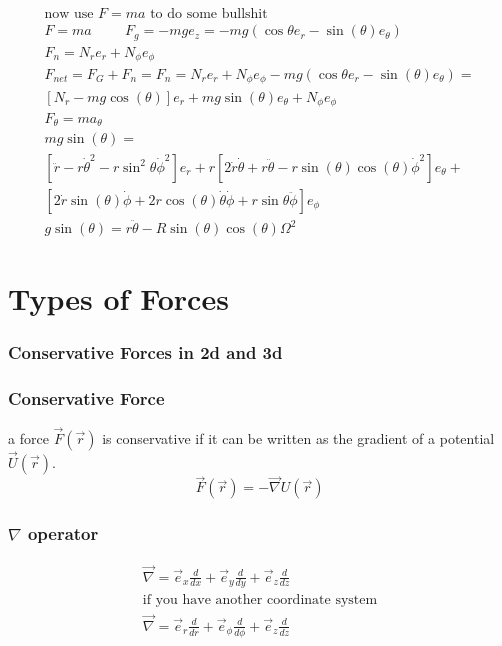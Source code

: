 \documentclass[fleqn]{report}
\newcommand{\hp}{\hspace{1cm}}
\newcommand{\equations} [1] {
\begin{gather*}
#1
\end{gather*}
}
\begin{document}
\equations{
    \textrm{now use $F = ma$ to do some bullshit}
    \\
    F = ma \hp F_g = -mg e_z = 
    -mg (\cos \theta e_r - \sin(\theta) e_\theta )
    \\
    F_n = N_r e_r + N_\phi e_\phi
    \\
    F_{net} = F_G + F_n = 
    F_n = N_r e_r + N_\phi e_\phi
    -mg (\cos \theta e_r - \sin(\theta) e_\theta )
    = \\
    [N_r - mg \cos(\theta)] e_r +
    mg \sin (\theta) e_\theta + 
    N_\phi e_\phi
    \\
    F_\theta = m a_\theta
    \\
    mg \sin(\theta) = \\
    [\ddot r - r \dot \theta^2 - 
    r \sin^2 \theta \dot \phi^2] e_r 
    +
    r[2 \dot r \dot \theta + r \ddot \theta  - 
    r \sin(\theta) \cos(\theta) \dot \phi^2] e_\theta 
    + \\
    [2\dot r \sin(\theta) \dot \phi + 
    2 r \cos(\theta) \dot \theta \dot \phi +
    r \sin \theta \ddot \phi] e_\phi
    \\
    g \sin(\theta) = r \ddot \theta -
    R \sin(\theta) \cos (\theta) \Omega^2
}

\chapter{Types of Forces}

\subsection{Conservative Forces in 2d and 3d}

\subsection{Conservative Force}
a force $\vec F( \vec r)$ is conservative if it can be written 
as the gradient of a potential $\vec U(\vec r)$.
\[
\vec F(\vec r) = - \vec \nabla U(\vec r)
\]

\subsection{$\nabla$ operator}
\equations{
    \vec \nabla =
    \vec e_x \frac{d}{dx} +
    \vec e_y \frac{d}{dy} +
    \vec e_z \frac{d}{dz}
    \\
    \textrm{if you have another coordinate system}
    \\
    \vec \nabla =
    \vec e_r \frac{d}{dr} +
    \vec e_\phi \frac{d}{d\phi} +
    \vec e_z \frac{d}{dz}
}
\end{document}
